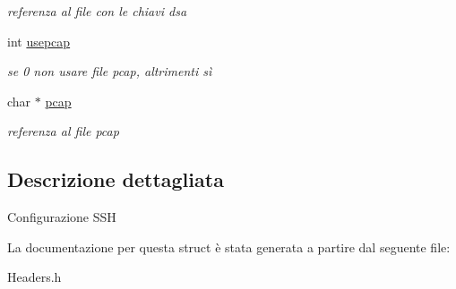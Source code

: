 \begin{DoxyCompactItemize}
\begin{DoxyCompactList}\small\item\em referenza al file con le chiavi dsa \end{DoxyCompactList}\item 
int \hyperlink{structsshconf_a63492312140e0a594d556bd187a601e0}{usepcap}\hypertarget{structsshconf_a63492312140e0a594d556bd187a601e0}{}\label{structsshconf_a63492312140e0a594d556bd187a601e0}

\begin{DoxyCompactList}\small\item\em se 0 non usare file pcap, altrimenti sì \end{DoxyCompactList}\item 
char $\ast$ \hyperlink{structsshconf_a43a1f28da9bffb5a86ccf7fad4e4d11d}{pcap}\hypertarget{structsshconf_a43a1f28da9bffb5a86ccf7fad4e4d11d}{}\label{structsshconf_a43a1f28da9bffb5a86ccf7fad4e4d11d}

\begin{DoxyCompactList}\small\item\em referenza al file pcap \end{DoxyCompactList}\end{DoxyCompactItemize}


\subsection{Descrizione dettagliata}
Configurazione S\+SH 

La documentazione per questa struct è stata generata a partire dal seguente file\+:\begin{DoxyCompactItemize}
\item 
Headers.\+h\end{DoxyCompactItemize}
